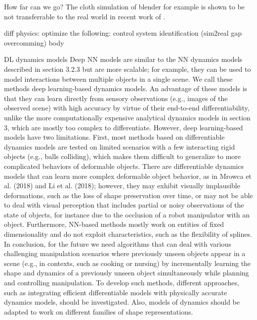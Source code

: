 \documentclass[\home/main.tex]{subfiles}
\begin{document}
How far can we go? The cloth simulation of blender for example is shown to be not transferrable to the real world in recent work of \autocite{Tanaka2018}.

diff physics:
    optimize the following:
        control
        system identification  (sim2real gap overcomming)
        body 


        DL dynamics models 
        Deep NN models are similar to      the NN dynamics models described in section 3.2.3 but are more
        scalable; for example, they can be used to model interactions
        between multiple objects in a single scene. We call these
        methods deep learning-based dynamics models. An advantage
        of these models is that they can learn directly from sensory
        observations (e.g., images of the observed scene) with high
        accuracy by virtue of their end-to-end differentiability, unlike
        the more computationally expensive analytical dynamics models
        in section 3, which are mostly too complex to differentiate.
        However, deep learning-based models have two limitations. First,
        most methods based on differentiable dynamics models are tested
        on limited scenarios with a few interacting rigid objects (e.g.,
        balls colliding), which makes them difficult to generalize to
        more complicated behaviors of deformable objects. There are
        differentiable dynamics models that can learn more complex
        deformable object behavior, as in Mrowca et al. (2018) and Li
        et al. (2018); however, they may exhibit visually implausible
        deformations, such as the loss of shape preservation over time,
        or may not be able to deal with visual perception that includes
        partial or noisy observations of the state of objects, for instance
        due to the occlusion of a robot manipulator with an object.
        Furthermore, NN-based methods mostly work on entities of fixed
        dimensionality and do not exploit characteristics, such as the
        flexibility of splines.
        In conclusion, for the future we need algorithms that
        can deal with various challenging manipulation scenarios
        where previously unseen objects appear in a scene (e.g.,
        in contexts, such as cooking or nursing) by incrementally
        learning the shape and dynamics of a previously unseen object
        simultaneously while planning and controlling manipulation.
        To develop such methods, different approaches, such as
        integrating efficient differentiable models with physically
        accurate dynamics models, should be investigated. Also, models
        of dynamics should be adapted to work on different families of
        shape representations.
    
\end{document}
